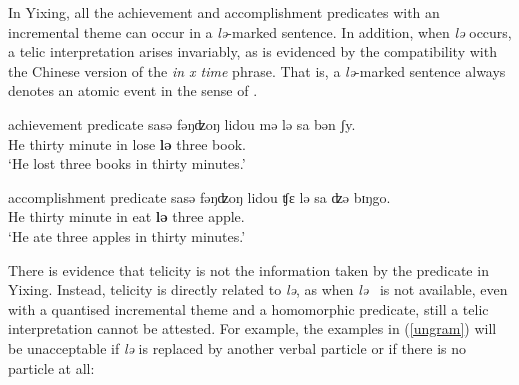 \documentclass[output=paper]{langsci/langscibook}
\begin{document}
In Yixing, all the achievement and accomplishment predicates with an
incremental theme can occur in a \emph{lə}-marked sentence. In addition, when
\emph{lə} occurs, a telic interpretation arises invariably, as is evidenced by
the compatibility with the Chinese version of the \emph{in x time} phrase. That
is, a \emph{lə}-marked sentence always denotes an atomic event in the sense of
\textcite{Rothstein2004}.

\begin{exe}
\ex achievement predicate
\sn \label{achievement predicate}  {sasə} {fəŋʣoŋ} lidou {mə} {lə} sa bən ʃy. \\
    He thirty minute in lose \textbf{lə} three \Clf{} book. \\
    \glt \enquote*{He lost three books in thirty minutes.}
\end{exe}

\begin{exe}
\ex accomplishment predicate
\sn \label{accomplishment predicate}  {sasə} {fəŋʣoŋ} lidou {ʧε} {lə} sa {ʣə} bɪŋgo. \\
    He thirty minute in eat \textbf{lə} three \Clf{} apple. \\
    \glt \enquote*{He ate three apples in thirty minutes.}
\end{exe}

There is evidence that telicity is not the information taken by the predicate
in Yixing. Instead, telicity is directly related to \emph{lə}, as when
\emph{lə} \ is not available, even with a quantised incremental theme and a
homomorphic predicate, still a telic interpretation cannot be attested. For
example, the examples in (\ref{ungram}) will be unacceptable if
\emph{lə} is replaced by another verbal particle or if there is no particle at
all:

\begin{exe}
    \ex\label{ungram} 
    \begin{xlist}
    \end{xlist}
\end{exe}
\end{document}
